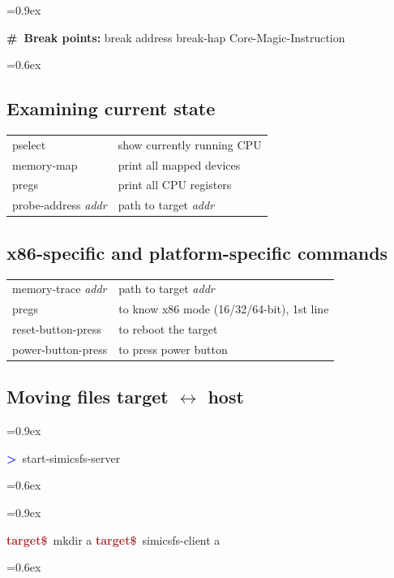 \documentclass[8pt]{extarticle}
\newenvironment{code}[1][]{%
\begin{prebox}[#1]\obeylines%
\fontdimen2\font=0.9ex%
}{%
\end{prebox}%
\fontdimen2\font=0.6ex%
}
\newcommand{\tprompt}{\textcolor{brown}{\textbf{target\$}\ }}
\newcommand{\sprompt}{\textcolor{blue}{\textbf{>}\ }}
\newcommand{\cmtcommon}[1]{\textcolor{Sepia}{\textbf{#1}}}
\newcommand{\cmt}[1]{\cmtcommon{\#\ #1}}
\newcommand{\p}[1]{\textit{\large#1}}
\begin{document}
\begin{multicols*}{3}
\begin{code}
\cmt{Break points:}
break address
break-hap Core-Magic-Instruction
\end{code}

\subsection{Examining current state}

\begin{tabular}{ll}
    pselect & show currently running CPU \\
    memory-map & print all mapped devices \\
    pregs & print all CPU registers \\
    probe-address \p{addr} & path to target \p{addr}
\end{tabular}

\subsection{x86-specific and platform-specific commands}

\begin{tabular}{ll}
    memory-trace \p{addr} & path to target \p{addr} \\
    pregs & to know x86 mode (16/32/64-bit), 1st line \\
    reset-button-press & to reboot the target \\
    power-button-press & to press power button \\
\end{tabular}

\subsection{Moving files target \texorpdfstring{$\longleftrightarrow$}{<->} host}
\begin{code}
\sprompt start-simicsfs-server
\end{code}

\begin{code}[colback=blue!15]
\tprompt mkdir a
\tprompt simicsfs-client a
\end{code}


\end{multicols*}
\end{document}

